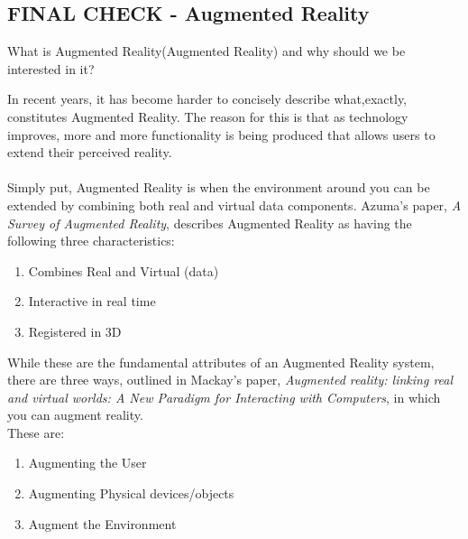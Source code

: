 \documentclass[11pt]{article}
\begin{document}
\subsection{FINAL CHECK - Augmented Reality}
\begin{center}
What is Augmented Reality(Augmented Reality) and why should we be interested in it? \\
\end{center}
In recent years, it has become harder to concisely describe what,exactly, 
constitutes Augmented Reality. The reason for this is that as technology
improves, more and more functionality is being produced that allows 
users to extend their perceived reality.\\ 
\\
Simply put, Augmented Reality is when the environment around you can be 
extended by combining both real and virtual data components. Azuma's 
paper, \textit{A Survey of Augmented Reality}\cite{Azuma97},
describes Augmented Reality as having the following three characteristics:
\begin{enumerate}
	\item Combines Real and Virtual (data) 
	\item Interactive in real time
	\item Registered in 3D
\end{enumerate}

While these are the fundamental attributes of an Augmented Reality system, there are 
three ways, outlined in Mackay's paper, 
\textit{Augmented reality: linking real and virtual worlds: 
A New Paradigm for Interacting with Computers}\cite{Mackay},
in which you can augment reality.\\
These are:
\begin{enumerate}
	\item Augmenting the User
	\item Augmenting Physical devices/objects
	\item Augment the Environment
\end{enumerate}
\end{document}
